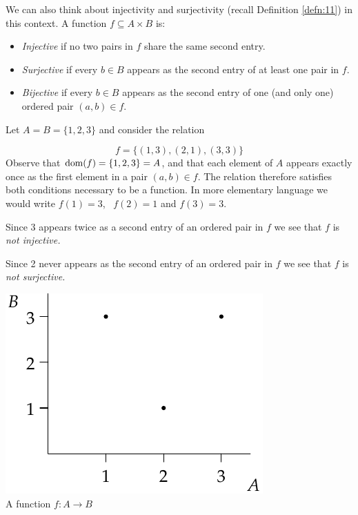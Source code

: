 We can also think about injectivity and surjectivity (recall Definition \ref{defn:11}) in this context. A function $f\subseteq A\times B$ is:
\begin{itemize}
  \item \emph{Injective} if no two pairs in $f$ share the same second entry.
  \item \emph{Surjective} if every $b\in B$ appears as the second entry of at least one pair in $f$.
  \item \emph{Bijective} if every $b\in B$ appears as the second entry of one (and only one) ordered pair $(a,b)\in f$.
\end{itemize}


\begin{example}{}{}
	Let $A=B=\{1,2,3\}$ and consider the relation\par
	\begin{minipage}[t]{0.62\linewidth}\vspace{0pt}
		\[
			f=\{(1,3),(2,1),(3,3)\}
		\]
		Observe that $\operatorname{dom}(f)=\{1,2,3\}=A$, and that each element of $A$ appears exactly once as the first element in a pair $(a,b)\in f$. The relation therefore satisfies both conditions necessary to be a function. In more elementary language we would write $f(1)=3$, \ $f(2)=1$ and $f(3)=3$.\par
		Since 3 appears twice as a second entry of an ordered pair in $f$ we see that $f$ is \emph{not injective.}\par
		Since 2 never appears as the second entry of an ordered pair in $f$ we see that $f$ is \emph{not surjective.}
	\end{minipage}
	\hfill
	\begin{minipage}[t]{0.35\linewidth}\vspace{0pt}
		\centering
		\includegraphics[scale=0.8]{relations-18-reln1}\\
		A function $f:A\to B$
	\end{minipage}
\end{example}

